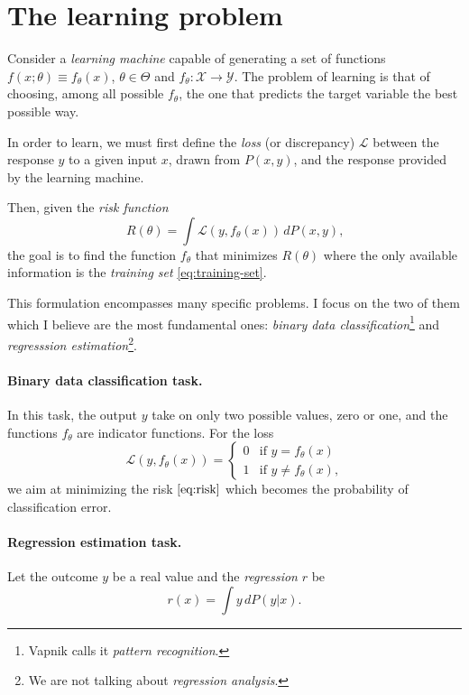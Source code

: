 \section{The learning problem}

Consider a \emph{learning machine} capable of generating a set of functions $f(x;
\theta) \equiv f_\theta(x)$, $\theta \in \Theta$ and $f_\theta : \mathcal{X} \rightarrow \mathcal{Y}$.
The problem of learning is that of choosing, among all possible $f_\theta$, the one that
predicts the target variable the best possible way.

In order to learn, we must first define the \emph{loss} (or discrepancy) $\mathcal{L}$
between the response $y$ to a given input $x$, drawn from $P(x, y)$, and the
response provided by the learning machine.

Then, given the \emph{risk function}
\begin{equation}
  \label{eq:risk}
  R(\theta) = \int \mathcal{L}(y, f_\theta(x))\, dP(x, y)\text{,}
\end{equation}
the goal is to find the function $f_\theta$ that minimizes $R(\theta)$
where the only available information is the \emph{training set} \eqref{eq:training-set}.

This formulation encompasses many specific problems. I focus on the two of them which I
believe are the most fundamental ones: \emph{binary data classification}\footnote{Vapnik
calls it \emph{pattern recognition}.} and \emph{regresssion estimation}\footnote{We are not talking about
\emph{regression analysis}.}.

\paragraph{Binary data classification task.}  In this task, the output $y$ take on
only two possible values, zero or one, and the functions $f_\theta$ are indicator
functions. For the loss
\begin{equation*}
  \mathcal{L}(y, f_\theta(x)) = \begin{cases}
    0 & \text{if } y = f_\theta(x) \\
    1 & \text{if } y \neq f_\theta(x)\text{,}
  \end{cases}
\end{equation*}
we aim at minimizing the risk $\eqref{eq:risk}$ which becomes the probability of
classification error.

\paragraph{Regression estimation task.} Let the outcome $y$ be a real value and
the \emph{regression} $r$ be $$r(x) = \int y\, dP(y|x) \text{.}$$
